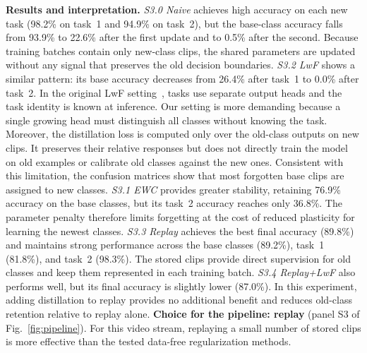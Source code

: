 \documentclass[conference]{IEEEtran}
\begin{document}
\textbf{Results and interpretation.}
\emph{S3.0 Naive} achieves high accuracy on each new task (98.2\% on task~1 and 94.9\% on task~2), but
the base-class accuracy falls from 93.9\% to 22.6\% after the first update and to 0.5\%
after the second. Because training batches contain only new-class clips, the shared
parameters are updated without any signal that preserves the old decision boundaries.
\emph{S3.2 LwF} shows a similar pattern: its base accuracy decreases from 26.4\% after
task~1 to 0.0\% after task~2. In the original LwF setting~\cite{li2017lwf}, tasks use
separate output heads and the task identity is known at inference. Our setting is more
demanding because a single growing head must distinguish all classes without knowing the
task. Moreover, the distillation loss is computed only over the old-class outputs on new
clips. It preserves their relative responses but does not directly train the model on old
examples or calibrate old classes against the new ones. Consistent with this limitation,
the confusion matrices show that most forgotten base clips are assigned to new classes.
\emph{S3.1 EWC} provides greater stability, retaining 76.9\% accuracy on the base classes,
but its task~2 accuracy reaches only 36.8\%. The parameter penalty therefore limits
forgetting at the cost of reduced plasticity for learning the newest classes.
\emph{S3.3 Replay} achieves the best final accuracy (89.8\%) and maintains strong
performance across the base classes (89.2\%), task~1 (81.8\%), and task~2 (98.3\%). The
stored clips provide direct supervision for old classes and keep them represented in each
training batch. \emph{S3.4 Replay+LwF} also performs well, but its final accuracy is
slightly lower (87.0\%). In this experiment, adding distillation to replay provides no
additional benefit and reduces old-class retention relative to replay alone.
\textbf{Choice for the pipeline: replay} (panel S3 of Fig.~\ref{fig:pipeline}). For this
video stream, replaying a small number of stored clips is more effective than the tested
data-free regularization methods.

\end{document}
